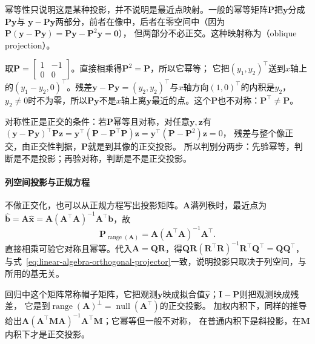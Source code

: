 幂等性只说明这是某种投影，并不说明是最近点映射。一般的幂等矩阵$\bm P$把$\bm y$分成$\bm P\bm y$与
$\bm y-\bm P\bm y$两部分，前者在像中，后者在零空间中（因为$\bm P(\bm y-\bm P\bm y)=\bm P\bm y-\bm P^2\bm y=\bm0$），
但两部分不必正交。这种映射称为（oblique projection）。

\begin{example}[反例：幂等而不对称的投影]
\label{ex:ls-oblique-projection}
取$\bm P=\left[\begin{smallmatrix}1&-1\\0&0\end{smallmatrix}\right]$。直接相乘得$\bm P^2=\bm P$，所以它幂等；
它把$(y_1,y_2)^\top$送到$x$轴上的$(y_1-y_2,0)^\top$。残差$\bm y-\bm P\bm y=(y_2,y_2)^\top$与$x$轴方向$(1,0)^\top$的内积是$y_2$，
$y_2\neq0$时不为零，所以$\bm P\bm y$不是$x$轴上离$\bm y$最近的点。这个$\bm P$也不对称：$\bm P^\top\neq\bm P$。
\end{example}

对称性正是正交的条件：若$\bm P$幂等且对称，对任意$\bm y,\bm z$有
$(\bm y-\bm P\bm y)^\top\bm P\bm z=\bm y^\top(\bm P-\bm P^\top\bm P)\bm z=\bm y^\top(\bm P-\bm P^2)\bm z=0$，
残差与整个像正交，由正交性判据，$\bm P$就是到其像的正交投影。
所以判别分两步：先验幂等，判断是不是投影；再验对称，判断是不是正交投影。

\paragraph{列空间投影与正规方程}

不做正交化，也可以从正规方程写出投影矩阵。$\bm A$满列秩时，最近点为
$\hat{\bm b}=\bm A\hat{\bm x}=\bm A(\bm A^\top\bm A)^{-1}\bm A^\top\bm b$，故
\begin{equation}
 \bm P_{\operatorname{range}(\bm A)}=\bm A(\bm A^\top\bm A)^{-1}\bm A^\top.
 \label{eq:ls-column-space-projector}
\end{equation}
直接相乘可验它对称且幂等。代入$\bm A=\bm Q\bm R$，得$\bm Q\bm R(\bm R^\top\bm R)^{-1}\bm R^\top\bm Q^\top=\bm Q\bm Q^\top$，
与式~\eqref{eq:linear-algebra-orthogonal-projector}一致，说明投影只取决于列空间，与所用的基无关。

回归中这个矩阵常称帽子矩阵，它把观测$\bm y$映成拟合值$\hat{\bm y}$；$\bm I-\bm P$则把观测映成残差，
它是到$\operatorname{range}(\bm A)^\perp=\operatorname{null}(\bm A^\top)$的正交投影。
加权内积下，同样的推导给出$\bm A(\bm A^\top\bm M\bm A)^{-1}\bm A^\top\bm M$；它幂等但一般不对称，
在普通内积下是斜投影，在$\bm M$内积下才是正交投影。

